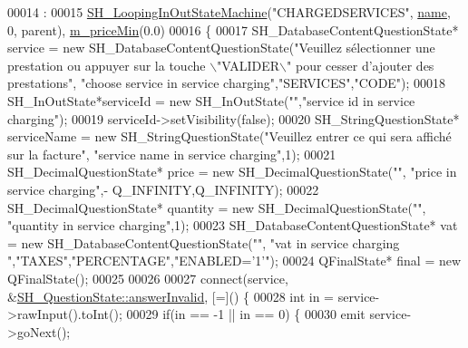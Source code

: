 \begin{DoxyCode}
00014                                                                     :
00015     \hyperlink{classSimpleHotel_1_1SH__LoopingInOutStateMachine_af4b22111a0eb0e14682940f6aabe477f}{SH\_LoopingInOutStateMachine}(\textcolor{stringliteral}{"CHARGEDSERVICES"},
      \hyperlink{classSimpleHotel_1_1SH__NamedObject_ad144716345034c91cface8f3163a799e}{name}, 0, parent), \hyperlink{classSimpleHotel_1_1SH__ServiceCharging_a72f1c4a2c5ae6344b9e8a8dbd85f1029}{m\_priceMin}(0.0)
00016 \{
00017     SH\_DatabaseContentQuestionState* service = \textcolor{keyword}{new} SH\_DatabaseContentQuestionState(\textcolor{stringliteral}{"Veuillez sélectionner
       une prestation ou appuyer sur la touche \(\backslash\)"VALIDER\(\backslash\)" pour cesser d'ajouter des prestations"}, \textcolor{stringliteral}{"choose service
       in service charging"},\textcolor{stringliteral}{"SERVICES"},\textcolor{stringliteral}{"CODE"});
00018     SH\_InOutState*serviceId = \textcolor{keyword}{new} SH\_InOutState(\textcolor{stringliteral}{""},\textcolor{stringliteral}{"service id in service charging"});
00019     serviceId->setVisibility(\textcolor{keyword}{false});
00020     SH\_StringQuestionState* serviceName = \textcolor{keyword}{new} SH\_StringQuestionState(\textcolor{stringliteral}{"Veuillez entrer ce qui sera affiché
       sur la facture"}, \textcolor{stringliteral}{"service name in service charging"},1);
00021     SH\_DecimalQuestionState* price = \textcolor{keyword}{new} SH\_DecimalQuestionState(\textcolor{stringliteral}{""}, \textcolor{stringliteral}{"price in service charging"},-
      Q\_INFINITY,Q\_INFINITY);
00022     SH\_DecimalQuestionState* quantity = \textcolor{keyword}{new} SH\_DecimalQuestionState(\textcolor{stringliteral}{""}, \textcolor{stringliteral}{"quantity in service charging"},1);
00023     SH\_DatabaseContentQuestionState* vat = \textcolor{keyword}{new} SH\_DatabaseContentQuestionState(\textcolor{stringliteral}{""}, \textcolor{stringliteral}{"vat in service charging
      "},\textcolor{stringliteral}{"TAXES"},\textcolor{stringliteral}{"PERCENTAGE"},\textcolor{stringliteral}{"ENABLED='1'"});
00024     QFinalState* \textcolor{keyword}{final} = \textcolor{keyword}{new} QFinalState();
00025 
00026 
00027     connect(service, &\hyperlink{classSimpleHotel_1_1SH__QuestionState_a69caaa66c68de820a5afa9584f24ca31}{SH\_QuestionState::answerInvalid}, [=]() \{
00028         \textcolor{keywordtype}{int} in = service->rawInput().toInt();
00029         \textcolor{keywordflow}{if}(in == -1 || in == 0) \{
00030             emit service->goNext();

\end{DoxyCode}
